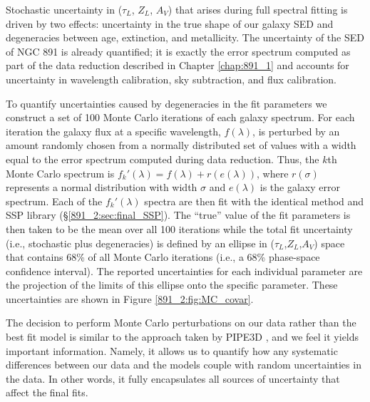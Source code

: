 Stochastic uncertainty in ($\tau_L$, $Z_L$, $A_V$) that arises during
full spectral fitting is driven by two effects: uncertainty in the
true shape of our galaxy SED and degeneracies between age, extinction,
and metallicity. The uncertainty of the SED of NGC 891 is already
quantified; it is exactly the error spectrum computed as part of the
data reduction described in Chapter \ref{chap:891_1} and accounts for
uncertainty in wavelength calibration, sky subtraction, and flux
calibration.

To quantify uncertainties caused by degeneracies in the fit parameters
we construct a set of 100 Monte Carlo iterations of each galaxy
spectrum. For each iteration the galaxy flux at a specific wavelength,
$f(\lambda)$, is perturbed by an amount randomly chosen from a
normally distributed set of values with a width equal to the error
spectrum computed during data reduction. Thus, the $k$th Monte Carlo
spectrum is $f_k'(\lambda) = f(\lambda) + r(e(\lambda))$, where
$r(\sigma)$ represents a normal distribution with width $\sigma$ and
$e(\lambda)$ is the galaxy error spectrum. Each of the $f_k'(\lambda)$
spectra are then fit with the identical method and SSP library
(\S\ref{891_2:sec:final_SSP}). The ``true'' value of the fit
parameters is then taken to be the mean over all 100 iterations while
the total fit uncertainty (i.e., stochastic plus degeneracies) is
defined by an ellipse in ($\tau_L$,$Z_L$,$A_V$) space that contains
68\% of all Monte Carlo iterations (i.e., a 68\% phase-space
confidence interval). The reported uncertainties for each individual
parameter are the projection of the limits of this ellipse onto the
specific parameter. These uncertainties are shown in Figure
\ref{891_2:fig:MC_covar}.

The decision to perform Monte Carlo perturbations on our data rather
than the best fit model is similar to the approach taken by PIPE3D
\citep{Sanchez16}, and we feel it yields important
information. Namely, it allows us to quantify how any systematic
differences between our data and the models couple with random
uncertainties in the data. In other words, it fully encapsulates all
sources of uncertainty that affect the final fits.


